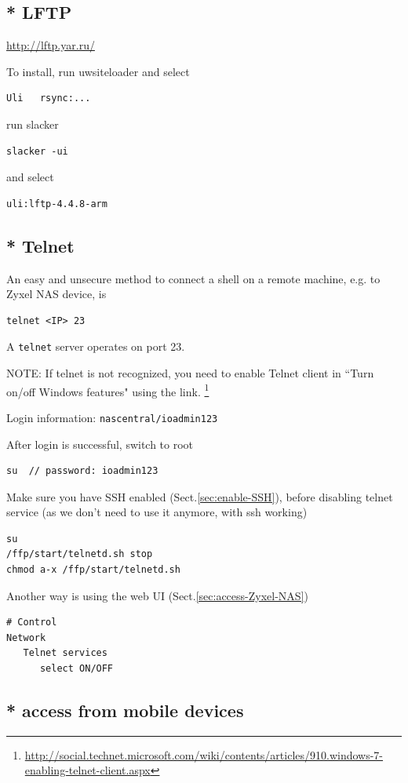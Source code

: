 \subsection{* LFTP}

\url{http://lftp.yar.ru/}

To install, run uwsiteloader and select 
\begin{verbatim}
Uli   rsync:...
\end{verbatim}
run slacker
\begin{verbatim}
slacker -ui
\end{verbatim}
and select
\begin{verbatim}
uli:lftp-4.4.8-arm
\end{verbatim}

\subsection{* Telnet}
\label{sec:telnet}

An easy and unsecure method to connect a shell on a remote machine, e.g. to
Zyxel NAS device, is
\begin{verbatim}
telnet <IP> 23
\end{verbatim}
A \verb!telnet! server operates on port 23.

NOTE: If telnet is not recognized, you need to enable Telnet client in ``Turn
on/off Windows features" using the link.
\footnote{\url{http://social.technet.microsoft.com/wiki/contents/articles/910.windows-7-enabling-telnet-client.aspx}}

Login information: \verb!nascentral/ioadmin123!

After login is successful, switch to root 
\begin{verbatim}
su  // password: ioadmin123
\end{verbatim}

Make sure you have SSH enabled (Sect.\ref{sec:enable-SSH}), before disabling
telnet service (as we don't need to use it anymore, with ssh working)
\begin{verbatim}
su 
/ffp/start/telnetd.sh stop
chmod a-x /ffp/start/telnetd.sh 
\end{verbatim}
Another way is using the web UI (Sect.\ref{sec:access-Zyxel-NAS})
\begin{verbatim}
# Control
Network
   Telnet services
      select ON/OFF
\end{verbatim}

\subsection{* access from mobile devices}


